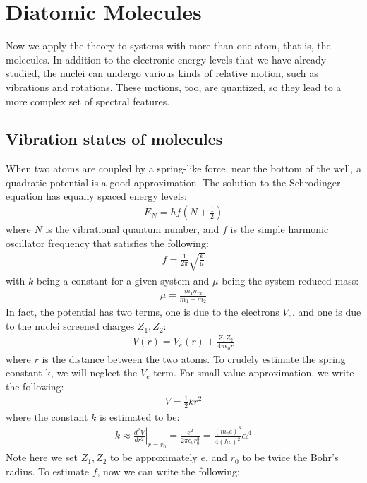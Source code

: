 \documentclass[11pt]{article}
\theoremstyle{break}
\theoremstyle{break}
\begin{document}
\newpage
\section[Diatomic Molecules]{Diatomic Molecules}
Now we apply the theory to systems with more than one atom, that is, the molecules. In addition to the electronic energy levels that we have already studied, the nuclei can undergo various kinds of relative motion, such as vibrations and rotations. These motions, too, are quantized, so they lead to a more complex set of spectral features.\\

\subsection{Vibration states of molecules}
When two atoms are coupled by a spring-like force, near the bottom of the well, a quadratic potential is a good approximation. The solution to the Schrodinger equation has equally spaced energy levels:
\begin{align*}
E_N = hf\left( N + \frac{1}{2}\right)
\end{align*}
where $N$ is the vibrational quantum number, and $f$ is the simple harmonic oscillator frequency that satisfies the following:
\begin{align*}
f = \frac{1}{2\pi}\sqrt{\frac{k}{\mu}}
\end{align*}
with $k$ being a constant for a given system and $\mu$ being the system reduced mass:
\begin{align*}
\mu = \frac{m_1m_2}{m_1 + m_2}
\end{align*}
In fact, the potential has two terms, one is due to the electrons $V_e$. and one is due to the nuclei screened charges $Z_1,Z_2$:
\begin{align*}
V(r)= V_e(r) + \frac{Z_1Z_2}{4\pi \epsilon_0 r}
\end{align*}
where $r$ is the distance between the two atoms. To crudely estimate
the spring constant k, we will neglect the $V_e$ term. For small value approximation, we write the following:
\begin{align*}
V = \frac{1}{2} k r^2
\end{align*}
where the constant $k$ is estimated to be:
\begin{align*}
k \approx \left.\frac{d^2 V}{dr^2}\right|_{r=r_0} = \frac{e^2}{2\pi \epsilon_0 r_0^3} = \frac{(m_e c)^3}{4(\hbar c)^2}\alpha^4
\end{align*}
Note here we set $Z_1,Z_2$ to be approximately $e$. and $r_0$ to be twice the Bohr's radius. To estimate $f$, now we can write the following:
\end{document}
